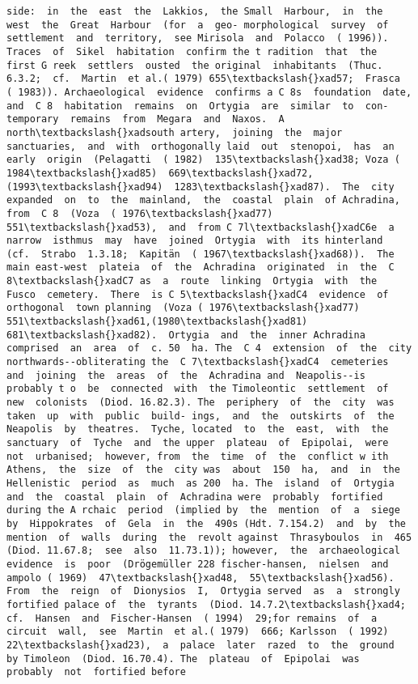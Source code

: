 \documentclass[11pt]{article}
\begin{document}
\begin{Verbatim}[commandchars=\\\{\}]
 side:  in  the  east  the  Lakkios,  the Small  Harbour,  in  the  west  the  Great  Harbour  (for  a  geo- morphological  survey  of  settlement  and  territory,  see Mirisola  and  Polacco  ( 1996)).  Traces  of  Sikel  habitation  confirm the t radition  that  the  first G reek  settlers  ousted  the original  inhabitants  (Thuc. 6.3.2;  cf.  Martin  et al.( 1979) 655\textbackslash{}xad57;  Frasca  ( 1983)). Archaeological  evidence  confirms a C 8s  foundation  date, and  C 8  habitation  remains  on  Ortygia  are  similar  to  con- temporary  remains  from  Megara  and  Naxos.  A  north\textbackslash{}xadsouth artery,  joining  the  major  sanctuaries,  and  with  orthogonally laid  out  stenopoi,  has  an  early  origin  (Pelagatti  ( 1982)  135\textbackslash{}xad38; Voza ( 1984\textbackslash{}xad85)  669\textbackslash{}xad72,(1993\textbackslash{}xad94)  1283\textbackslash{}xad87).  The  city expanded  on  to  the  mainland,  the  coastal  plain  of Achradina,  from  C 8  (Voza  ( 1976\textbackslash{}xad77)  551\textbackslash{}xad53),  and  from C 7l\textbackslash{}xadC6e  a  narrow  isthmus  may  have  joined  Ortygia  with  its hinterland  (cf.  Strabo  1.3.18;  Kapitän  ( 1967\textbackslash{}xad68)).  The  main east-west  plateia  of  the  Achradina  originated  in  the  C 8\textbackslash{}xadC7 as  a  route  linking  Ortygia  with  the  Fusco  cemetery.  There  is C 5\textbackslash{}xadC4  evidence  of  orthogonal  town planning  (Voza ( 1976\textbackslash{}xad77)  551\textbackslash{}xad61,(1980\textbackslash{}xad81)  681\textbackslash{}xad82).  Ortygia  and  the  inner Achradina  comprised  an  area  of  c. 50  ha. The  C 4  extension  of  the  city  northwards--obliterating the  C 7\textbackslash{}xadC4  cemeteries  and  joining  the  areas  of  the  Achradina and  Neapolis--is probably t o  be  connected  with  the Timoleontic  settlement  of  new  colonists  (Diod. 16.82.3). The  periphery  of  the  city  was  taken  up  with  public  build- ings,  and  the  outskirts  of  the  Neapolis  by  theatres.  Tyche, located  to  the  east,  with  the  sanctuary  of  Tyche  and  the upper  plateau  of  Epipolai,  were  not  urbanised;  however, from  the  time  of  the  conflict w ith  Athens,  the  size  of  the  city was  about  150  ha,  and  in  the  Hellenistic  period  as  much  as 200  ha. The  island  of  Ortygia  and  the  coastal  plain  of  Achradina were  probably  fortified during the A rchaic  period  (implied by  the  mention  of  a  siege  by  Hippokrates  of  Gela  in  the  490s (Hdt. 7.154.2)  and  by  the  mention  of  walls  during  the  revolt against  Thrasyboulos  in  465  (Diod. 11.67.8;  see  also  11.73.1)); however,  the  archaeological  evidence  is  poor  (Drögemüller 228 fischer-hansen,  nielsen  and  ampolo ( 1969)  47\textbackslash{}xad48,  55\textbackslash{}xad56).  From  the  reign  of  Dionysios  I,  Ortygia served  as  a  strongly  fortified palace of  the  tyrants  (Diod. 14.7.2\textbackslash{}xad4;  cf.  Hansen  and  Fischer-Hansen  ( 1994)  29;for remains  of  a  circuit  wall,  see  Martin  et al.( 1979)  666; Karlsson  ( 1992)  22\textbackslash{}xad23),  a  palace  later  razed  to  the  ground  by Timoleon  (Diod. 16.70.4). The  plateau  of  Epipolai  was  probably  not  fortified before 
\end{Verbatim}
\end{document}
